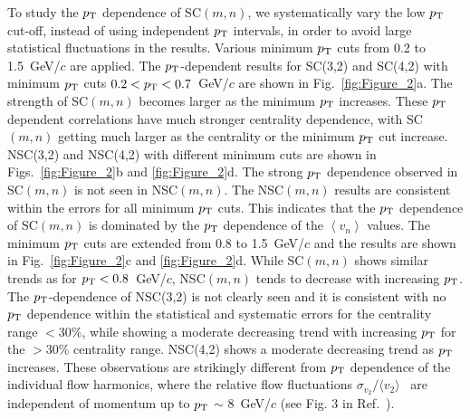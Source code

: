 To study the $p_{\rm T}$ dependence of SC$(m,n)$, we systematically vary the low $p_{\rm T}$ cut-off, instead of using independent $p_{\rm T}$ intervals, in order to avoid large statistical fluctuations in the results. Various minimum $p_{\rm T}$ cuts from 0.2 to 1.5~GeV/$c$ are applied.
The $p_{\rm T}$-dependent results for SC(3,2) and SC(4,2) with minimum $p_{\rm T}$ cuts $0.2<p_{\rm T}<0.7$~GeV/$c$ are shown in Fig.~\ref{fig:Figure_2}a.
The strength of SC$(m,n)$ becomes larger as the minimum $p_{\rm T}$ increases. 
These $p_{\rm T}$ dependent correlations have much stronger centrality dependence, with SC$(m,n)$ getting much larger as the centrality or the minimum $p_{\rm T}$ cut increase. 
NSC(3,2) and NSC(4,2) with different minimum cuts are shown in Figs.~\ref{fig:Figure_2}b and \ref{fig:Figure_2}d.
The strong $p_{\rm T}$ dependence observed in SC$(m,n)$ is not seen in NSC$(m,n)$. The NSC$(m,n)$ results are consistent within the errors for all minimum $p_{\rm T}$ cuts. 
This indicates that the $p_{\rm T}$ dependence of SC$(m,n)$ is dominated by the $p_{\rm T}$  dependence of the $\left<v_n\right>$ values. 
The minimum $p_{\rm T}$ cuts are extended from 0.8  to 1.5~GeV/$c$ and the results are shown in Fig.~\ref{fig:Figure_2}c and \ref{fig:Figure_2}d.
While SC$(m,n)$ shows similar trends as for $p_{\rm T}<0.8$~GeV/$c$, NSC$(m,n)$ tends to decrease with increasing $p_{\rm T}$.
The $p_{\rm T}$-dependence of NSC(3,2) is not clearly seen and it is consistent with no $p_{\rm T}$ dependence within the statistical and systematic errors for the centrality range $<$30\%, while showing a moderate decreasing trend with increasing $p_{\rm T}$ for the $>$30\% centrality range.
NSC(4,2) shows a moderate decreasing trend as $p_{\rm T}$ increases. These observations are strikingly different from $p_{\rm T}$ dependence of the individual flow harmonics, where the relative flow fluctuations $\sigma_{v_2}/\langle v_{2} \rangle$~\cite{Voloshin:2008dg} are independent of momentum up to $p_{\rm T}$ $\sim$ 8~GeV/$c$ (see Fig. 3 in Ref.~\cite{Abelev:2012di}).

